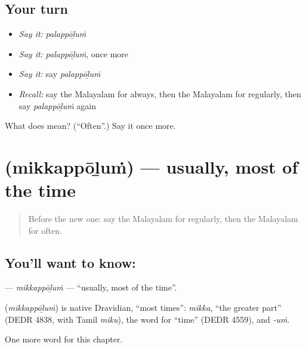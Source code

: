 \subsection*{Your turn}
\begin{itemize}
\raggedright
  \item \emph{Say it:} \emph{palappōḻuṁ}
  \item \emph{Say it:} \emph{palappōḻuṁ}, once more
  \item \emph{Say it:} say \emph{palappōḻuṁ}
  \item \emph{Recall:} say the Malayalam for always, then the Malayalam for regularly, then say \emph{palappōḻuṁ} again
\end{itemize}

\begin{tcolorbox}[breakable,colback=teal!4,colframe=teal!35!black,title={Before you move on}]
What does  mean? (\textquotedblleft{}Often\textquotedblright{}.) Say it once more.
\end{tcolorbox}
\section[\texorpdfstring{\ml{മിക്കപ്പോഴും} (mikkappōḻuṁ)}{മിക്കപ്പോഴും (mikkappōḻuṁ)}]{ (mikkappōḻuṁ) — usually, most of the time}

\label{lesson:ML-C276-mikkappolum}



\begin{quote}
Before the new one: say the Malayalam for regularly, then the Malayalam for often.
\end{quote}

\subsection*{You'll want to know: }
\textbf{} — \emph{mikkappōḻuṁ} — \textquotedblleft{}usually, most of the time\textquotedblright{}.

\begin{cousinweb}
\textbf{} (\emph{mikkappōḻuṁ}) is native Dravidian, \textquotedblleft{}most times\textquotedblright{}: \emph{mikka}, \textquotedblleft{}the greater part\textquotedblright{} (DEDR 4838, with Tamil \emph{miku}), the word for \textquotedblleft{}time\textquotedblright{} (DEDR 4559), and \emph{-uṁ}.
\end{cousinweb}

\begin{grammarlens}[title={What you've built}]
One more word for this chapter.
\end{grammarlens}

